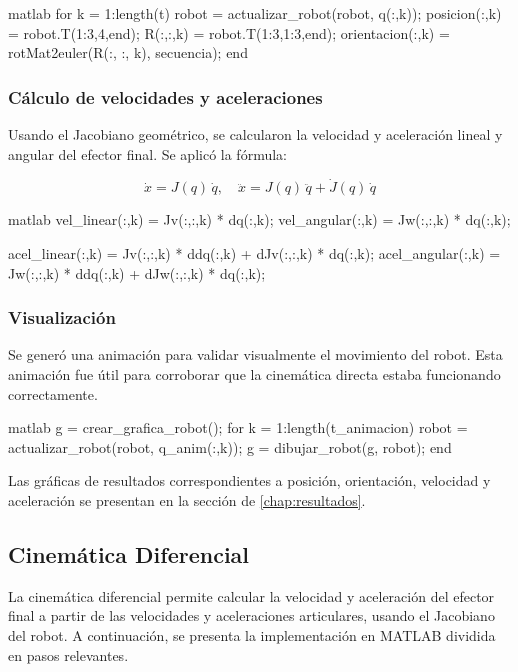 \begin{matlabcode}{matlab}
	for k = 1:length(t)
	robot = actualizar_robot(robot, q(:,k));
	posicion(:,k) = robot.T(1:3,4,end);
	R(:,:,k) = robot.T(1:3,1:3,end);
	orientacion(:,k) = rotMat2euler(R(:, :, k), secuencia);
	end
\end{matlabcode}

\subsubsection*{Cálculo de velocidades y aceleraciones}

Usando el Jacobiano geométrico, se calcularon la velocidad y aceleración lineal y angular del efector final. Se aplicó la fórmula:

\[
\dot{x} = J(q)\,\dot{q}, \quad \ddot{x} = J(q)\,\ddot{q} + \dot{J}(q)\,\dot{q}
\]

\begin{matlabcode}{matlab}
	vel_linear(:,k)  = Jv(:,:,k) * dq(:,k); 
	vel_angular(:,k) = Jw(:,:,k) * dq(:,k);  
	
	acel_linear(:,k)  = Jv(:,:,k) * ddq(:,k) + dJv(:,:,k) * dq(:,k); 
	acel_angular(:,k) = Jw(:,:,k) * ddq(:,k) + dJw(:,:,k) * dq(:,k);
\end{matlabcode}

\subsubsection*{Visualización}

Se generó una animación para validar visualmente el movimiento del robot. Esta animación fue útil para corroborar que la cinemática directa estaba funcionando correctamente.

\begin{matlabcode}{matlab}
	g = crear_grafica_robot();
	for k = 1:length(t_animacion)
	robot = actualizar_robot(robot, q_anim(:,k));
	g = dibujar_robot(g, robot);
	end
\end{matlabcode}

Las gráficas de resultados correspondientes a posición, orientación, velocidad y aceleración se presentan en la sección de \autoref{chap:resultados}.

\subsection{Cinemática Diferencial}

La cinemática diferencial permite calcular la velocidad y aceleración del efector final a partir de las velocidades y aceleraciones articulares, usando el Jacobiano del robot. A continuación, se presenta la implementación en MATLAB dividida en pasos relevantes.

